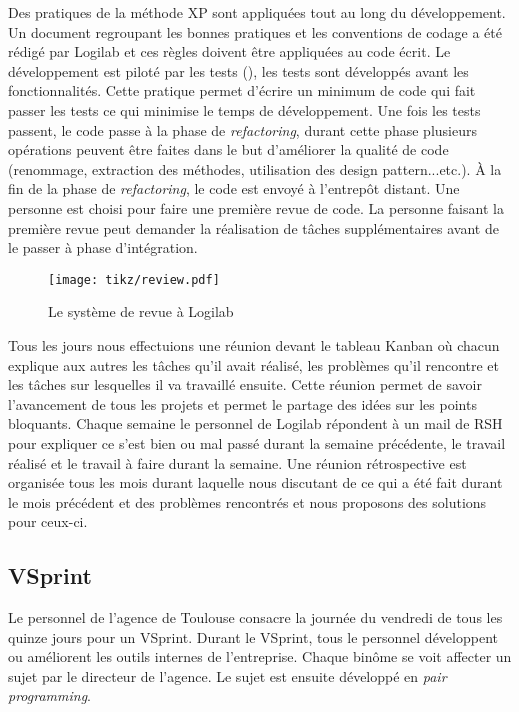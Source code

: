 Des pratiques de la méthode XP sont appliquées tout au long du développement. Un document regroupant les bonnes pratiques et les conventions de codage a été rédigé par Logilab et ces règles doivent être appliquées au code écrit. Le développement est piloté par les tests (), les tests sont développés avant les fonctionnalités. Cette pratique permet d'écrire un minimum de code qui fait passer les tests ce qui minimise le temps de développement. Une fois les tests passent, le code passe à la phase de \textit{refactoring}, durant cette phase plusieurs opérations peuvent être faites dans le but d'améliorer la qualité de code (renommage, extraction des méthodes, utilisation des design pattern...etc.). \`A la fin de la phase de \textit{refactoring}, le code est envoyé à l’entrepôt distant. Une personne est choisi pour faire une première revue de code. La personne faisant la première revue peut demander la réalisation de tâches supplémentaires avant de le passer à phase d'intégration. 

\begin{figure}
\centering
  \texttt{[image: tikz/review.pdf]}
  \caption{Le système de revue à Logilab}
  \label{fig:review}
\end{figure}

Tous les jours nous effectuions une réunion devant le tableau Kanban où chacun explique aux autres les tâches qu'il avait réalisé, les problèmes qu'il rencontre et les tâches sur lesquelles il va travaillé ensuite. Cette réunion permet de savoir l'avancement de tous les projets et permet le partage des idées sur les points bloquants. Chaque semaine le personnel de Logilab répondent à un mail de RSH pour expliquer ce s'est bien ou mal passé durant la semaine précédente, le travail réalisé et le travail à faire durant la semaine. Une réunion rétrospective est organisée tous les mois durant laquelle nous discutant de ce qui a été fait durant le mois précédent et des problèmes rencontrés et nous proposons des solutions pour ceux-ci. 

\subsection{VSprint}
Le personnel de l'agence de Toulouse consacre la journée du vendredi de tous les quinze jours pour un VSprint. Durant le VSprint, tous le personnel développent ou améliorent les outils internes de l'entreprise. Chaque binôme se voit affecter un sujet par le directeur de l'agence. Le sujet est ensuite développé en \textit{pair programming}.


